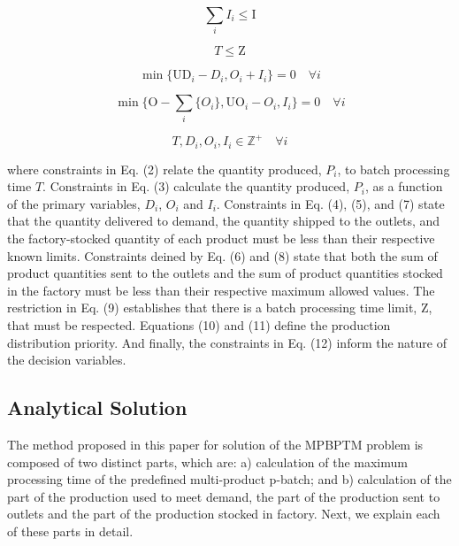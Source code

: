 \documentclass[10pt,fleqn,a4paper,twoside]{article}
\begin{document}
\begin{equation}
\sum_i{I_i} \leq \textrm{I}
\end{equation}

\begin{equation}
T \leq \textrm{Z}
\end{equation}

\begin{equation}
\min \{\textrm{UD}_i - D_i, O_i + I_i\} = 0 \quad \forall i
\end{equation}

\begin{equation}
\min\{\textrm{O} - \sum_i\{ O_i\}, \textrm{UO}_i - O_i, I_i\} = 0 \quad \forall i
\end{equation}

\begin{equation}
\label{MBPTMP10}
T, D_i, O_i, I_i \in  \mathbb{Z}^ + \quad \forall i
\end{equation}

where constraints in Eq. (2) relate the quantity produced, $P_i$, to batch processing time $T$. Constraints in Eq. (3) calculate the quantity produced, $P_i$, as a function of the primary variables, $D_i$, $O_i$ and $I_i$. Constraints in Eq. (4), (5), and (7) state that the quantity delivered to demand, the quantity shipped to the outlets, and the factory-stocked quantity of each product must be less than their respective known limits. Constraints deined by Eq. (6) and (8) state that both the sum of product quantities sent to the outlets and the sum of product quantities stocked in the factory must be less than their respective maximum allowed values. The restriction in Eq. (9) establishes that there is a batch processing time limit, $\textrm{Z}$, that must be respected. Equations (10) and (11) define the production distribution priority. And finally, the constraints in Eq. (12) inform the nature of the decision variables.

\subsection{Analytical Solution}
\label{sec:analyticalSol}

The method proposed in this paper for solution of the MPBPTM problem is composed of two distinct parts, which are: a) calculation of the maximum processing time of the predefined multi-product p-batch; and b) calculation of the part of the production used to meet demand, the part of the production sent to outlets and the part of the production stocked in factory. Next, we explain each of these parts in detail. \\
\end{document}
